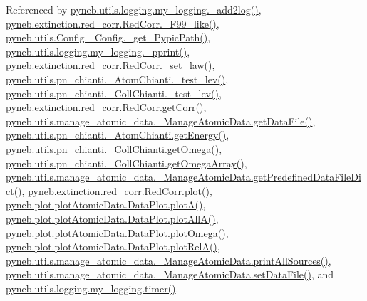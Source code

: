Referenced by \hyperlink{logging_8py_source_l00059}{pyneb.\+utils.\+logging.\+my\+\_\+logging.\+\_\+add2log()}, \hyperlink{red__corr_8py_source_l00658}{pyneb.\+extinction.\+red\+\_\+corr.\+Red\+Corr.\+\_\+\+F99\+\_\+like()}, \hyperlink{_config_8py_source_l00086}{pyneb.\+utils.\+Config.\+\_\+\+Config.\+\_\+get\+\_\+\+Pypic\+Path()}, \hyperlink{logging_8py_source_l00051}{pyneb.\+utils.\+logging.\+my\+\_\+logging.\+\_\+pprint()}, \hyperlink{red__corr_8py_source_l00176}{pyneb.\+extinction.\+red\+\_\+corr.\+Red\+Corr.\+\_\+set\+\_\+law()}, \hyperlink{pn__chianti_8py_source_l00284}{pyneb.\+utils.\+pn\+\_\+chianti.\+\_\+\+Atom\+Chianti.\+\_\+test\+\_\+lev()}, \hyperlink{pn__chianti_8py_source_l00449}{pyneb.\+utils.\+pn\+\_\+chianti.\+\_\+\+Coll\+Chianti.\+\_\+test\+\_\+lev()}, \hyperlink{red__corr_8py_source_l00211}{pyneb.\+extinction.\+red\+\_\+corr.\+Red\+Corr.\+get\+Corr()}, \hyperlink{manage__atomic__data_8py_source_l00297}{pyneb.\+utils.\+manage\+\_\+atomic\+\_\+data.\+\_\+\+Manage\+Atomic\+Data.\+get\+Data\+File()}, \hyperlink{pn__chianti_8py_source_l00346}{pyneb.\+utils.\+pn\+\_\+chianti.\+\_\+\+Atom\+Chianti.\+get\+Energy()}, \hyperlink{pn__chianti_8py_source_l00484}{pyneb.\+utils.\+pn\+\_\+chianti.\+\_\+\+Coll\+Chianti.\+get\+Omega()}, \hyperlink{pn__chianti_8py_source_l00461}{pyneb.\+utils.\+pn\+\_\+chianti.\+\_\+\+Coll\+Chianti.\+get\+Omega\+Array()}, \hyperlink{manage__atomic__data_8py_source_l00034}{pyneb.\+utils.\+manage\+\_\+atomic\+\_\+data.\+\_\+\+Manage\+Atomic\+Data.\+get\+Predefined\+Data\+File\+Dict()}, \hyperlink{red__corr_8py_source_l00303}{pyneb.\+extinction.\+red\+\_\+corr.\+Red\+Corr.\+plot()}, \hyperlink{plot_atomic_data_8py_source_l00116}{pyneb.\+plot.\+plot\+Atomic\+Data.\+Data\+Plot.\+plot\+A()}, \hyperlink{plot_atomic_data_8py_source_l00188}{pyneb.\+plot.\+plot\+Atomic\+Data.\+Data\+Plot.\+plot\+All\+A()}, \hyperlink{plot_atomic_data_8py_source_l00372}{pyneb.\+plot.\+plot\+Atomic\+Data.\+Data\+Plot.\+plot\+Omega()}, \hyperlink{plot_atomic_data_8py_source_l00261}{pyneb.\+plot.\+plot\+Atomic\+Data.\+Data\+Plot.\+plot\+Rel\+A()}, \hyperlink{manage__atomic__data_8py_source_l00431}{pyneb.\+utils.\+manage\+\_\+atomic\+\_\+data.\+\_\+\+Manage\+Atomic\+Data.\+print\+All\+Sources()}, \hyperlink{manage__atomic__data_8py_source_l00380}{pyneb.\+utils.\+manage\+\_\+atomic\+\_\+data.\+\_\+\+Manage\+Atomic\+Data.\+set\+Data\+File()}, and \hyperlink{logging_8py_source_l00115}{pyneb.\+utils.\+logging.\+my\+\_\+logging.\+timer()}.

\hypertarget{classpyneb_1_1plot_1_1plot_atomic_data_1_1_data_plot_a50a9af3695633a64c66d082ed67d1bfb}{}
